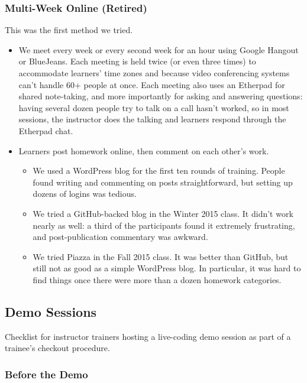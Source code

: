 \subsubsection{Multi-Week Online
(Retired)}\label{multi-week-online-retired}

This was the first method we tried.

\begin{itemize}
\item
  We meet every week or every second week for an hour using Google
  Hangout or BlueJeans. Each meeting is held twice (or even three times)
  to accommodate learners' time zones and because video conferencing
  systems can't handle 60+ people at once. Each meeting also uses an
  Etherpad for shared note-taking, and more importantly for asking and
  answering questions: having several dozen people try to talk on a call
  hasn't worked, so in most sessions, the instructor does the talking
  and learners respond through the Etherpad chat.
\item
  Learners post homework online, then comment on each other's work.

  \begin{itemize}
    \item
    We used a WordPress blog for the first ten rounds of training.
    People found writing and commenting on posts straightforward, but
    setting up dozens of logins was tedious.
  \item
    We tried a GitHub-backed blog in the Winter 2015 class. It didn't
    work nearly as well: a third of the participants found it extremely
    frustrating, and post-publication commentary was awkward.
  \item
    We tried Piazza in the Fall 2015 class. It was better than GitHub,
    but still not as good as a simple WordPress blog. In particular, it
    was hard to find things once there were more than a dozen homework
    categories.
  \end{itemize}
\end{itemize}

\subsection{Demo Sessions}\label{demo-sessions}

Checklist for instructor trainers hosting a live-coding demo session as
part of a trainee's checkout procedure.

\subsubsection{Before the Demo}\label{before-the-demo}

